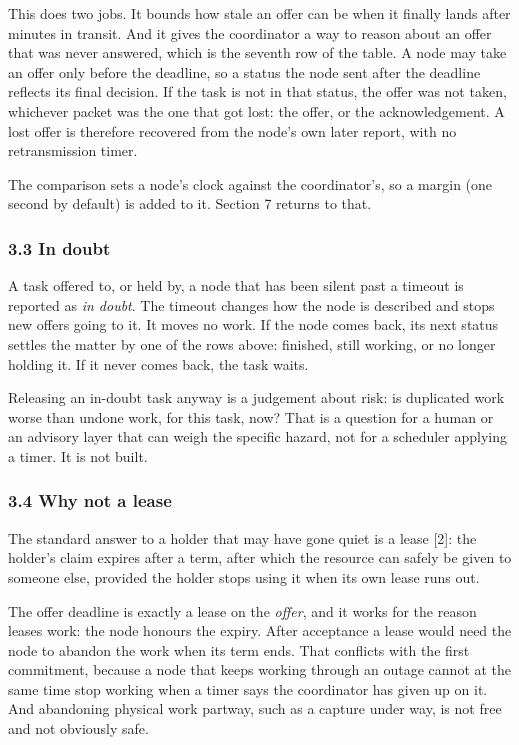 \documentclass[
  12pt,
  letterpaper,
]{article}
\begin{document}
This does two jobs. It bounds how stale an offer can be when it finally
lands after minutes in transit. And it gives the coordinator a way to
reason about an offer that was never answered, which is the seventh row
of the table. A node may take an offer only before the deadline, so a
status the node sent after the deadline reflects its final decision. If
the task is not in that status, the offer was not taken, whichever
packet was the one that got lost: the offer, or the acknowledgement. A
lost offer is therefore recovered from the node's own later report, with
no retransmission timer.

The comparison sets a node's clock against the coordinator's, so a
margin (one second by default) is added to it. Section 7 returns to
that.

\hypertarget{in-doubt}{%
\subsubsection{3.3 In doubt}\label{in-doubt}}

A task offered to, or held by, a node that has been silent past a
timeout is reported as \emph{in doubt}. The timeout changes how the node
is described and stops new offers going to it. It moves no work. If the
node comes back, its next status settles the matter by one of the rows
above: finished, still working, or no longer holding it. If it never
comes back, the task waits.

Releasing an in-doubt task anyway is a judgement about risk: is
duplicated work worse than undone work, for this task, now? That is a
question for a human or an advisory layer that can weigh the specific
hazard, not for a scheduler applying a timer. It is not built.

\hypertarget{why-not-a-lease}{%
\subsubsection{3.4 Why not a lease}\label{why-not-a-lease}}

The standard answer to a holder that may have gone quiet is a lease
{[}2{]}: the holder's claim expires after a term, after which the
resource can safely be given to someone else, provided the holder stops
using it when its own lease runs out.

The offer deadline is exactly a lease on the \emph{offer}, and it works
for the reason leases work: the node honours the expiry. After
acceptance a lease would need the node to abandon the work when its term
ends. That conflicts with the first commitment, because a node that
keeps working through an outage cannot at the same time stop working
when a timer says the coordinator has given up on it. And abandoning
physical work partway, such as a capture under way, is not free and not
obviously safe.
\end{document}
